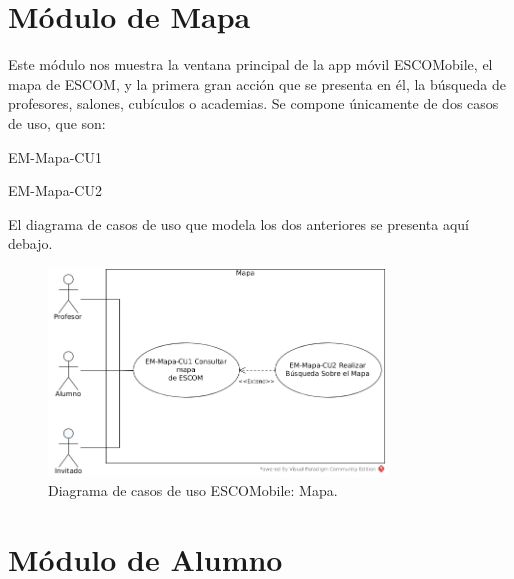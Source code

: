 \section{Módulo de Mapa}

\noindent
Este módulo nos muestra la ventana principal de la app móvil ESCOMobile, el mapa de ESCOM, y
la primera gran acción que se presenta en él, la búsqueda de profesores, salones, cubículos o academias. 
Se compone únicamente de dos casos de uso, que son:

\begin{requisitos}{EM-Mapa-CU1}
\end{requisitos}

\begin{requisitos}{EM-Mapa-CU2}
\end{requisitos}

\noindent
El diagrama de casos de uso que modela los dos anteriores se presenta aquí debajo.

\pagebreak
\begin{figure}[htbp!]
	\centering
	\includegraphics[width=0.8\textwidth]{images/casos/mapa}
	\caption{Diagrama de casos de uso ESCOMobile: Mapa.}
\end{figure}




\section{Módulo de Alumno}

